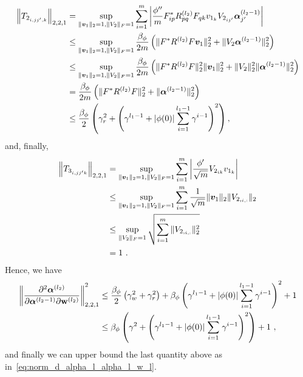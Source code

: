     \begin{align}
        \begin{aligned}
            \left\|T_{2_{i,jj',k}} \right\|_{2,2,1} 
            &= \sup_{\|{\bm{v}}_1\|_2 = 1, \|V_2\|_F =1} \sum_{i=1}^m
            \left| 
                \frac{\phi''}{m} F^*_{ip}R^{(l_2)}_{pq}F_{qk}v_{1_k} V_{2_{ij'}}\boldsymbol{\alpha}^{(l_2-1)}_{j'}
            \right|\\
             &\leq \sup_{\|{\bm{v}}_1\|_2 = 1, \|V_2\|_F =1}
             \frac{\beta_{\phi}}{2m}\left( 
                \| F^*R^{(l_2)}F{\bm{v}}_1\|_2^2 + \| V_2\boldsymbol{\alpha}^{(l_2-1)}\|_2^2 
             \right)\\
             &\leq \sup_{\|{\bm{v}}_1\|_2 = 1, \|V_2\|_F =1}
             \frac{\beta_{\phi}}{2m}\left( 
                \| F^*R^{(l_2)}F\|_2^2\lVert{\bm{v}}_1\rVert_2^2 + \lVert V_2\rVert_2^2\| \boldsymbol{\alpha}^{(l_2-1)}\|_2^2 
             \right)\\
             &=            \frac{\beta_{\phi}}{2m}\left( 
                \| F^*R^{(l_2)}F\|_2^2 + \| \boldsymbol{\alpha}^{(l_2-1)}\|_2^2 
             \right)\\
             &\leq \frac{\beta_{\phi}}{2}  
                \left(\gamma_r^2 + \left(\gamma^{l_1-1}+|\phi(0)| \sum_{i=1}^{l_1-1} \gamma^{i-1}\right)^2\right),
        \end{aligned}
    \end{align}
    and, finally,
    \begin{align}
        \begin{aligned}
            \left\|T_{3_{i,jj'k}} \right\|_{2,2,1} 
            &= \sup_{\|{\bm{v}}_1\|_2 = 1, \|V_2\|_F =1} \sum_{i=1}^m
            \left| 
                \frac{\phi'}{\sqrt{m}}V_{2_{ik}}v_{1_k}
            \right|\\
            &\leq \sup_{\|{\bm{v}}_1\|_2 = 1, \|V_2\|_F =1} \sum_{i=1}^m
            \frac{1}{\sqrt{m}}\|{\bm{v}}_1\|_2 \|V_{2,_{i,:}}\|_2\\
            &\leq \sup_{\|V_2\|_F =1}\sqrt{\sum_{i=1}^m
            \|V_{2,_{i,:}}\|_2^2}\\
            &= 1~.
        \end{aligned}
    \end{align}
    Hence, we have
    \begin{align}
        \begin{aligned}
            \left\|\frac{\partial^2\boldsymbol{\alpha}^{{(l_2)}}}{\partial \boldsymbol{\alpha}^{(l_2-1)}\partial{\mathbf{w}^{(l_2)}}} \right\|_{2,2,1}^2
            &\leq 
            \frac{\beta_{\phi}}{2}\left( \gamma_w^2 + \gamma_r^2\right) + \beta_{\phi} \left( 
                \gamma^{l_1 - 1} + |\phi(0)| \sum_{i=1}^{l_1 - 1} \gamma^{i-1}
        \right)^2+1\\
        &\leq 
            \beta_{\phi}\left( \gamma^2 +
                \left(\gamma^{l_1 - 1} + |\phi(0)| \sum_{i=1}^{l_1 - 1} \gamma^{i-1}\right)^2
        \right)+1~,
        \end{aligned}
    \end{align}
and finally we can upper bound the last quantity above as in~\eqref{eq:norm_d_alpha_l_alpha_l_w_l}.

